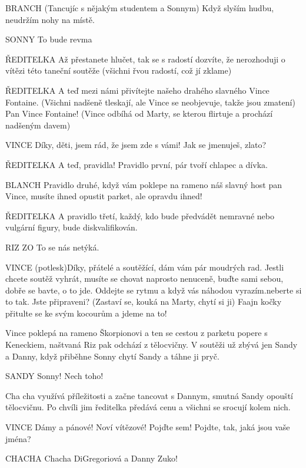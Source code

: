 BRANCH (Tancujíc s nějakým studentem a Sonnym) Když slyším hudbu, neudržím nohy na místě. 

SONNY        To bude revma

ŘEDITELKA         Až přestanete hlučet, tak se s radostí dozvíte, že nerozhoduji o vítězi této taneční soutěže (všichni řvou radostí, což jí zklame) 

ŘEDITELKA        A teď mezi námi přivítejte našeho drahého slavného Vince Fontaine. (Všichni nadšeně tleskají, ale Vince se neobjevuje, takže jsou zmatení) Pan Vince Fontaine! (Vince odbíhá od Marty, se kterou flirtuje a prochází nadšeným davem) 

VINCE        Díky, děti, jsem rád, že jsem zde s vámi! Jak se jmenuješ, zlato? 

ŘEDITELKA        A teď, pravidla!         Pravidlo první, pár tvoří chlapec a dívka. 

BLANCH            Pravidlo druhé, když vám poklepe na rameno náš slavný host pan Vince, musíte ihned opustit parket, ale opravdu ihned! 

ŘEDITELKA        A pravidlo třetí, každý, kdo bude předvádět nemravné nebo vulgární         figury, bude diskvalifikován. 

RIZ        ZO        To se nás netýká. 

VINCE        (potlesk)Díky, přátelé a soutěžící, dám vám pár moudrých rad. Jestli                 chcete soutěž vyhrát, musíte se chovat naprosto nenuceně, buďte sami         sebou, dobře se bavte, o to jde. Oddejte se rytmu a když vás náhodou         vyrazím.neberte si to tak. Jste  připraveni? (Zastaví se, kouká na Marty,         chytí si ji) Faajn kočky přitulte se ke svým kocourům a jdeme na to!

Vince poklepá na rameno Škorpionovi a ten se cestou z parketu popere s Keneckiem, naštvaná Riz pak odchází z tělocvičny. V soutěži už zbývá jen Sandy a Danny, když přiběhne Sonny chytí Sandy a táhne ji pryč.

SANDY        Sonny! Nech toho!

Cha cha využívá příležitosti a začne tancovat s Dannym, smutná Sandy opouští tělocvičnu. Po chvíli jim ředitelka předává cenu a všichni se srocují kolem nich. 

VINCE        Dámy a pánové! Noví vítězové! Pojďte sem! Pojdte, tak, jaká jsou vaše         jména?

CHACHA        Chacha DiGregoriová a Danny Zuko!





